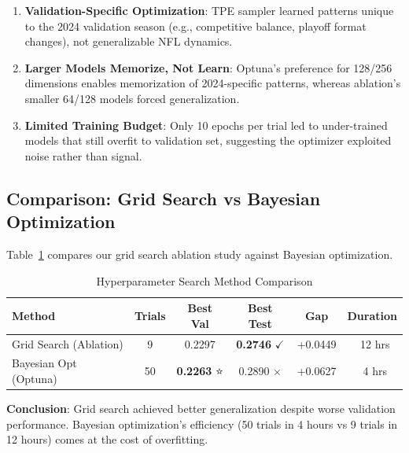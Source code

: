 \begin{enumerate}
    \item \textbf{Validation-Specific Optimization}: TPE sampler learned patterns unique to the 2024 validation season (e.g., competitive balance, playoff format changes), not generalizable NFL dynamics.

    \item \textbf{Larger Models Memorize, Not Learn}: Optuna's preference for 128/256 dimensions enables memorization of 2024-specific patterns, whereas ablation's smaller 64/128 models forced generalization.

    \item \textbf{Limited Training Budget}: Only 10 epochs per trial led to under-trained models that still overfit to validation set, suggesting the optimizer exploited noise rather than signal.
\end{enumerate}

\subsection{Comparison: Grid Search vs Bayesian Optimization}
\label{subsec:optuna_comparison}

Table~\ref{tab:optuna_ablation_comparison} compares our grid search ablation study against Bayesian optimization.

\begin{table}[htbp]
\centering
\caption{Hyperparameter Search Method Comparison}
\label{tab:optuna_ablation_comparison}
\small
\begin{tabular}{@{}lccccc@{}}
\toprule
\textbf{Method} & \textbf{Trials} & \textbf{Best Val} & \textbf{Best Test} & \textbf{Gap} & \textbf{Duration} \\
\midrule
Grid Search (Ablation) & 9 & 0.2297 & \textbf{0.2746} $\checkmark$ & +0.0449 & ~12 hrs \\
Bayesian Opt (Optuna) & 50 & \textbf{0.2263} ⭐ & 0.2890 $\times$ & +0.0627 & ~4 hrs \\
\bottomrule
\end{tabular}

\vspace{0.5em}
\footnotesize
\textbf{Conclusion}: Grid search achieved better generalization despite worse validation performance. Bayesian optimization's efficiency (50 trials in 4 hours vs 9 trials in 12 hours) comes at the cost of overfitting.
\end{table}

